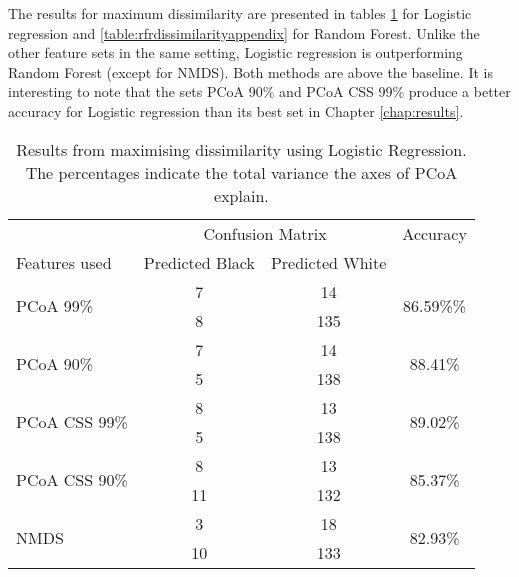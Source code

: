 The results for maximum dissimilarity are presented in tables \ref{table:lrdissimilarityappendix} for Logistic regression and \ref{table:rfrdissimilarityappendix} for Random Forest. Unlike the other feature sets in the same setting, Logistic regression is outperforming Random Forest (except for NMDS). Both methods are above the baseline. It is interesting to note that the sets PCoA 90\% and PCoA CSS 99\% produce a better accuracy for Logistic regression than its best set in Chapter \ref{chap:results}. 
\begin{table}[h]
	\centering
	\begin{tabular}{l c  c c}
		\toprule
		&\multicolumn{2}{c}{Confusion Matrix} & Accuracy\\
		Features used & Predicted Black&Predicted White&\\
		\midrule
		\multirow{2}{*}{PCoA 99\%} &7 &14&\multirow{2}{*}{86.59\%\%}\\
		&	 8&135&\\
		\cmidrule{2-3}
		\multirow{2}{*}{PCoA 90\%} &7 &14&\multirow{2}{*}{88.41\%}\\
		&	 5&138&\\
		\cmidrule{2-3}
		\multirow{2}{*}{PCoA CSS 99\%} &8 &13&\multirow{2}{*}{89.02\%}\\
		&	 5&138&\\
		\cmidrule{2-3}
		\multirow{2}{*}{PCoA CSS 90\%} &8 &13&\multirow{2}{*}{85.37\%}\\
		&	11&132&\\
		\cmidrule{2-3}
		\multirow{2}{*}{NMDS}&3 &18&\multirow{2}{*}{82.93\%}\\
		&	 10&133&\\
		\bottomrule
	\end{tabular}
	\caption{Results from maximising dissimilarity using Logistic Regression. The percentages indicate the total variance the axes of PCoA explain.}
	\label{table:lrdissimilarityappendix}
\end{table}

